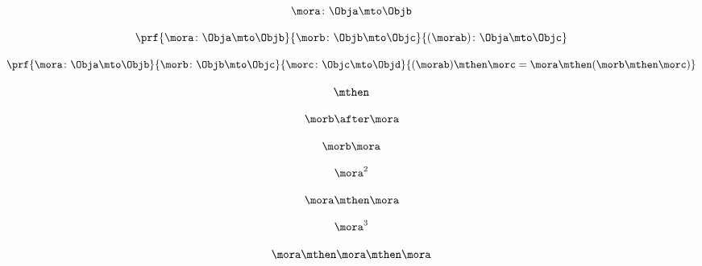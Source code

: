 \begin{forslides}
    \begin{equation}
        \label{eq:semicats-slides-61}
        \mora\colon \Obja \mto \Objb
    \end{equation}

    \begin{equation}
        \label{eq:semicats-slides-62}
        \prf{
            \mora \colon \Obja \mto \Objb
        }{
            \morb\colon \Objb \mto \Objc
        }{
            (\morab )\colon \Obja \mto \Objc
        }
    \end{equation}

    \begin{equation}
        \label{eq:semicats-slides-63}
        \prf{
            \mora \colon \Obja \mto \Objb
        }{
            \morb\colon \Objb \mto \Objc
        }{
            \morc \colon \Objc \mto \Objd
        }{
            (\morab ) \mthen \morc = \mora \mthen ( \morb  \mthen \morc )
        }
    \end{equation}
    
    
 

    \begin{equation}
        \label{eq:semicats-slides-64}
        \mthen
    \end{equation}

    \begin{equation}
        \label{eq:semicats-slides-65}
        \morb\after \mora
    \end{equation}

    \begin{equation}
        \label{eq:semicats-slides-66}
        \morb \mora
    \end{equation}

    \begin{equation}
        \label{eq:semicats-slides-67}
        \mora^2
    \end{equation}

    \begin{equation}
        \label{eq:semicats-slides-68}
        \mora \mthen \mora
    \end{equation}

    \begin{equation}
        \label{eq:semicats-slides-69}
        \mora^3
    \end{equation}

    \begin{equation}
        \label{eq:semicats-slides-70}
        \mora \mthen \mora \mthen \mora
    \end{equation}


\end{forslides}
